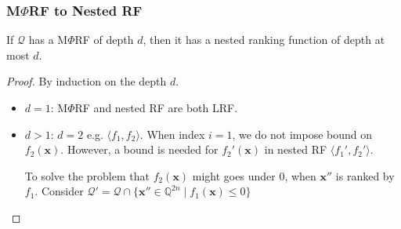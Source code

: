 \documentclass[11pt]{beamer}
\begin{document}
\begin{frame}\frametitle{M$\Phi$RF to Nested RF}
\begin{theorem}[1]
If $\mathcal{Q}$ has a M$\Phi$RF of depth $d$, then it has a nested ranking function of depth at most $d$.


\end{theorem}

\begin{proof}
By induction on the depth $d$.
\begin{itemize}
\item $d = 1$: M$\Phi$RF and nested RF are both LRF.
\item $d > 1$: $d = 2$ e.g.
$\langle f_1, f_2\rangle$. When index $i = 1$, we do not impose bound on $f_2(\textbf{x})$. However, a bound is needed for $f_2'(\textbf{x})$ in nested RF $\langle f_1', f_2'\rangle$.

To solve the problem that $f_2(\textbf{x})$ might goes under $0$, when $\textbf{x}''$ is ranked by $f_1$. Consider  $\mathcal{Q}' = \mathcal{Q}\cap \{\textbf{x}''\in \mathbb{Q}^{2n}\mid f_1(\textbf{x}) \le 0\}$


\end{itemize}


\end{proof}

\end{frame}
\end{document}
